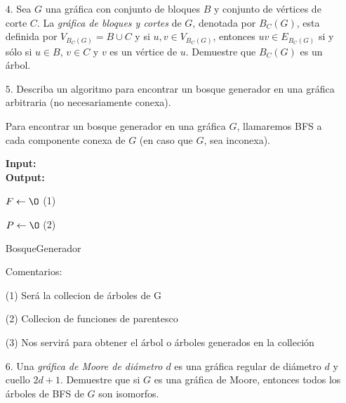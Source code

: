 \documentclass{article}
\begin{document}
\begin{enumerate}
\item[$4$.] Sea $G$ una gr\'afica con conjunto de bloques $B$ y conjunto de
  v\'ertices de corte $C$.   La {\em gr\'afica de bloques y cortes} de $G$,
  denotada por $B_C (G)$, esta definida por $V_{B_C (G)} = B \cup C$ y
  si $u, v \in V_{B_C (G)}$, entonces $uv \in E_{B_C (G)}$ si y s\'olo si
  $u \in B$, $v \in C$ y $v$ es un v\'ertice de $u$.   Demuestre que
  $B_C (G)$ es un \'arbol.
  
\item[$5$.] Describa un algoritmo para encontrar un bosque generador en una
  gr\'afica arbitraria (no necesariamente conexa).

  Para encontrar un bosque generador en una gráfica $G$, llamaremos BFS a cada componente conexa de $G$ (en caso que $G$, sea inconexa).\\
  
  \begin{algorithm}[H]
      \textbf{Input:} \\
      \textbf{Output:} 
      
      $F \leftarrow \O$  (1)
      
      $P \leftarrow \O$  (2)
      
      \caption{BosqueGenerador}
  \end{algorithm}

  Comentarios:

  (1) Será la collecion de árboles de G

  (2) Collecion de funciones de parentesco

  (3) Nos servirá para obtener el árbol o árboles generados en la colleción
  
\item[$6$.] Una {\em gr\'afica de Moore de di\'ametro $d$} es una gr\'afica
  regular de di\'ametro $d$ y cuello $2d+1$.   Demuestre que si $G$ es
  una gr\'afica de Moore, entonces todos los \'arboles de BFS de $G$
  son isomorfos.

\end{enumerate}
\end{document}

